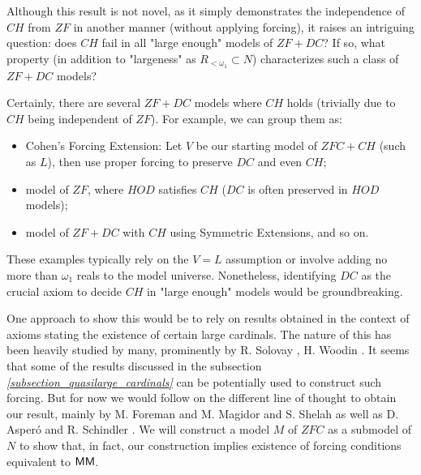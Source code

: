 Although this result is not novel, as it simply demonstrates the independence of $CH$ from $ZF$ in another manner (without applying forcing), it raises an intriguing question: does $CH$ fail in all "large enough" models of $ZF+DC$? If so, what property (in addition to "largeness" as $R_{<\omega_1} \subset N$) characterizes such a class of $ZF+DC$ models?

Certainly, there are several $ZF+DC$ models where $CH$ holds (trivially due to $CH$ being independent of $ZF$). For example, we can group them as:
\begin{itemize}
    \item Cohen's Forcing Extension: Let $V$ be our starting model of $ZFC+CH$ (such as $L$), then use proper forcing to preserve $DC$ and even $CH$;
    \item model of $ZF$, where $HOD$ satisfies $CH$ ($DC$ is often preserved in $HOD$ models);
    \item model of $ZF+DC$ with $CH$ using Symmetric Extensions, and so on.
\end{itemize}

These examples typically rely on the $V=L$ assumption or involve adding no more than $\omega_1$ reals to the model universe. Nonetheless, identifying $DC$ as the crucial axiom to decide $CH$ in "large enough" models would be groundbreaking.

One approach to show this would be to rely on results obtained in the context of axioms stating the existence of certain large cardinals. The nature of this has been heavily studied by many, prominently by R. Solovay \cite{Solovay1970}, H. Woodin \cite{Woodin1999TheAO, Woodin2001TheCH, Woodin2001TheCH2, Woodin2011SetTA}. It seems that some of the results discussed in the subsection \textit{\ref{subsection_quasilarge_cardinals} } can be potentially used to construct such forcing. But for now we would follow on the different line of thought to obtain our result, mainly by M. Foreman and M. Magidor and S. Shelah \cite{ForemanMagidorShelah1988} as well as D. Asperó and R. Schindler \cite{aspero2021sf}. We will construct a model $M$ of $ZFC$ as a submodel of $N$ to show that, in fact, our construction implies existence of forcing conditions equivalent to ${\sf MM}$.

